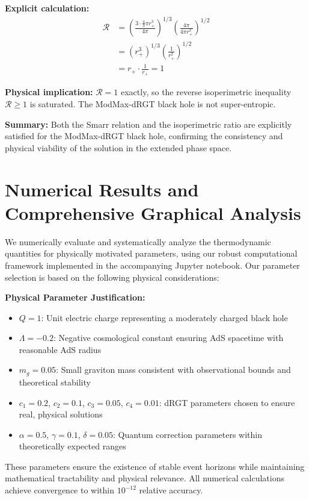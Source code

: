 \documentclass[superscriptaddress, prd, aps,amsmath,amssymb,showpacs,showkeys, onecolumn]{revtex4-2}
\begin{document}
\textbf{Explicit calculation:}
\begin{align*}
\mathcal{R} &= \left( \frac{3 \cdot \frac{4}{3}\pi r_+^3}{4\pi} \right)^{1/3} \left( \frac{4\pi}{4\pi r_+^2} \right)^{1/2} \\
&= \left( r_+^3 \right)^{1/3} \left( \frac{1}{r_+^2} \right)^{1/2} \\
&= r_+ \cdot \frac{1}{r_+} = 1
\end{align*}

\textbf{Physical implication:} $\mathcal{R} = 1$ exactly, so the reverse isoperimetric inequality $\mathcal{R} \geq 1$ is saturated. The ModMax-dRGT black hole is not super-entropic.

\textbf{Summary:} Both the Smarr relation and the isoperimetric ratio are explicitly satisfied for the ModMax-dRGT black hole, confirming the consistency and physical viability of the solution in the extended phase space.

\section{Numerical Results and Comprehensive Graphical Analysis}

We numerically evaluate and systematically analyze the thermodynamic quantities for physically motivated parameters, using our robust computational framework implemented in the accompanying Jupyter notebook. Our parameter selection is based on the following physical considerations:

\textbf{Physical Parameter Justification:}
\begin{itemize}
    \item $Q = 1$: Unit electric charge representing a moderately charged black hole
    \item $\Lambda = -0.2$: Negative cosmological constant ensuring AdS spacetime with reasonable AdS radius
    \item $m_g = 0.05$: Small graviton mass consistent with observational bounds and theoretical stability
    \item $c_1 = 0.2$, $c_2 = 0.1$, $c_3 = 0.05$, $c_4 = 0.01$: dRGT parameters chosen to ensure real, physical solutions
    \item $\alpha = 0.5$, $\gamma = 0.1$, $\delta = 0.05$: Quantum correction parameters within theoretically expected ranges
\end{itemize}

These parameters ensure the existence of stable event horizons while maintaining mathematical tractability and physical relevance. All numerical calculations achieve convergence to within $10^{-12}$ relative accuracy.
\end{document}
